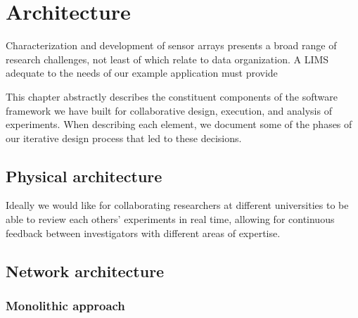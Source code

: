 \documentclass[../thesis]{subfiles}
\begin{document}
\chapter{Architecture}
Characterization and development of sensor arrays presents a broad
range of research challenges, not least of which relate to data
organization. A \gls{LIMS} adequate to the needs of our example
application must provide

This chapter abstractly describes the constituent components
of the software framework we have built for collaborative design,
execution, and analysis of experiments. When describing each
element, we document some of the phases of our iterative design
process that led to these decisions.

\section{Physical architecture}
Ideally we would like for collaborating researchers at different
universities to be able to review each others' experiments in real
time, allowing for continuous feedback between investigators with
different areas of expertise.

\section{Network architecture}

\subsection{Monolithic approach}
\end{document}
